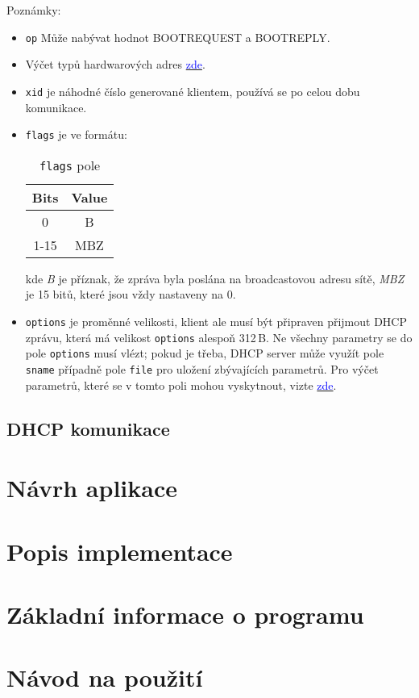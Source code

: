 \documentclass[a4paper, 11pt, hidelinks]{article}
\begin{document}

Poznámky:
\begin{itemize}
    \item \texttt{op} Může nabývat hodnot BOOTREQUEST a BOOTREPLY.
    \item Výčet typů hardwarových adres \href{https://www.iana.org/assignments/arp-parameters/arp-parameters.xhtml#arp-parameters-2}{\textcolor{blue}{zde}}.
    \item \texttt{xid} je náhodné číslo generované klientem, používá se po celou dobu komunikace.
    \item \texttt{flags} je ve formátu: 

        \begin{table}[ht]
            \centering
            \begin{tabular}{|c|c|}
            \hline
            \textbf{Bits} & \textbf{Value} \\
            \hline
            0             & B \\
            1-15          & MBZ \\
            \hline
            \end{tabular}
            \caption{\texttt{flags} pole}
            \label{tab:dhcp_flags}
        \end{table}
        
        kde \emph{B} je příznak, že zpráva byla poslána na broadcastovou adresu sítě, \emph{MBZ} je 15 bitů, které jsou vždy nastaveny na 0.
    \item \texttt{options} je proměnné velikosti, klient ale musí být připraven přijmout DHCP zprávu, která má velikost \texttt{options} alespoň 312\,B.
    Ne všechny parametry se do pole \texttt{options} musí vlézt; pokud je třeba, DHCP server může využít pole \texttt{sname} případně pole \texttt{file} pro uložení zbývajících parametrů.
    Pro výčet parametrů, které se v tomto poli mohou vyskytnout, vizte \href{https://www.iana.org/assignments/bootp-dhcp-parameters/bootp-dhcp-parameters.xhtml#options}{\textcolor{blue}{zde}}.
\end{itemize}

\subsection{DHCP komunikace}\label{1_2_komunikace}

\section{Návrh aplikace}\label{2_navrh}

\section{Popis implementace}\label{3_popis}

\section{Základní informace o programu}\label{4_zakladni_info}

\section{Návod na použití}\label{5_navod}
\end{document}
